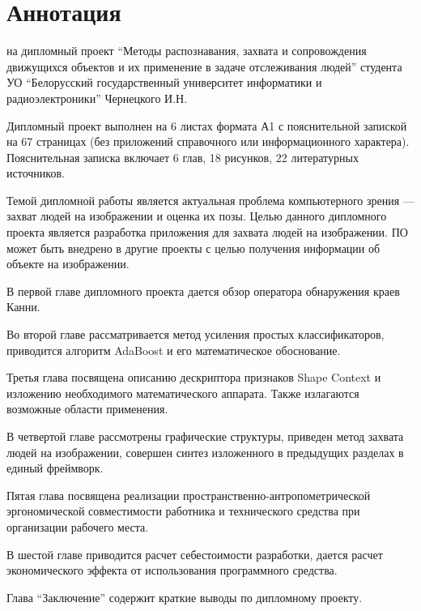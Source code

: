 \section*{Аннотация}
\thispagestyle{empty}

\begin{center}
  \begin{minipage}{0.8\textwidth}
    на дипломный проект ``Методы распознавания, захвата и сопровождения движущихся объектов и их применение в задаче отслеживания людей'' студента УО ``Белорусский государственный университет информатики и радиоэлектроники'' Чернецкого И.Н.
  \end{minipage}
\end{center}

Дипломный проект выполнен на 6 листах формата А1 с пояснительной запиской на 67 страницах (без приложений справочного или информационного характера). Пояснительная записка включает 6 глав, 18 рисунков, 22 литературных источников.

Темой дипломной работы является актуальная проблема компьютерного зрения --- захват людей на изображении и оценка их позы. Целью данного дипломного проекта является разработка приложения для захвата людей на изображении. ПО может быть внедрено в другие проекты с целью получения информации об объекте на изображении.

В первой главе дипломного проекта дается обзор оператора обнаружения краев Канни.

Во второй главе рассматривается метод усиления простых классификаторов, приводится алгоритм AdaBoost и его математическое обоснование.

Третья глава посвящена описанию дескриптора признаков Shape Context и изложению необходимого математического аппарата. Также излагаются возможные области применения.

В четвертой главе рассмотрены графические структуры, приведен метод захвата людей на изображении, совершен синтез изложенного в предыдущих разделах в единый фреймворк.

Пятая глава посвящена реализации пространственно\hyp{}антропометрической эргономической совместимости работника и технического средства при организации рабочего места.

В шестой главе приводится расчет себестоимости разработки, дается расчет экономического эффекта от использования программного средства. 

Глава ``Заключение'' содержит краткие выводы по дипломному проекту.

\newpage
